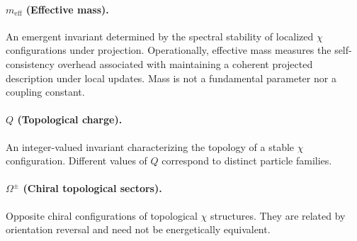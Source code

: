   \paragraph{\texorpdfstring{$m_{\mathrm{eff}}$}{meff} (Effective mass).}
    An emergent invariant determined by the spectral stability of localized
    $\chi$ configurations under projection.
    Operationally, effective mass measures the self-consistency overhead
    associated with maintaining a coherent projected description under
    local updates.
    Mass is not a fundamental parameter nor a coupling constant.

  \paragraph{\texorpdfstring{$Q$}{Q} (Topological charge).}
    An integer-valued invariant characterizing the topology of a stable
    $\chi$ configuration.
    Different values of $Q$ correspond to distinct particle families.

  \paragraph{\texorpdfstring{$\Omega^\pm$}{Ω±} (Chiral topological sectors).}
    Opposite chiral configurations of topological $\chi$ structures.
    They are related by orientation reversal and need not be energetically equivalent.
